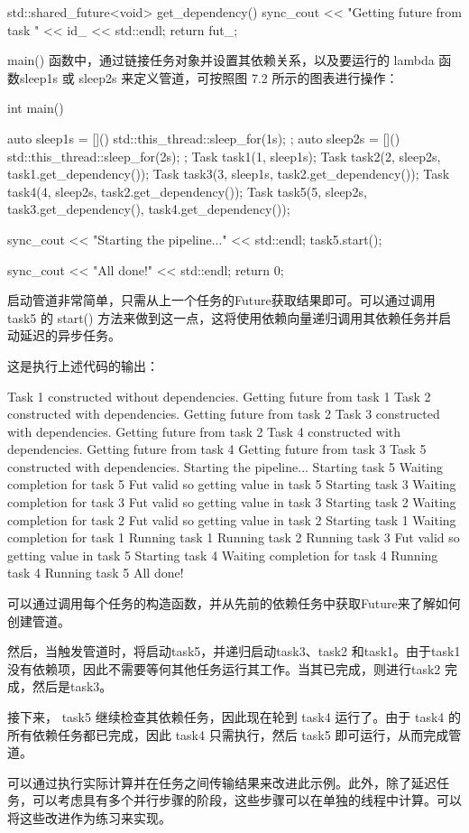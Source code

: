 \begin{cpp}
std::shared_future<void> get_dependency() {
    sync_cout << "Getting future from task "
              << id_ << std::endl;
    return fut_;
}
\end{cpp}

main() 函数中，通过链接任务对象并设置其依赖关系，以及要运行的 lambda 函数sleep1s 或 sleep2s 来定义管道，可按照图 7.2 所示的图表进行操作：

\begin{cpp}
int main() {
    auto sleep1s = [](){
        std::this_thread::sleep_for(1s);
    };
    auto sleep2s = [](){
        std::this_thread::sleep_for(2s);
    };
    Task task1(1, sleep1s);
    Task task2(2, sleep2s, task1.get_dependency());
    Task task3(3, sleep1s, task2.get_dependency());
    Task task4(4, sleep2s, task2.get_dependency());
    Task task5(5, sleep2s, task3.get_dependency(),
               task4.get_dependency());

    sync_cout << "Starting the pipeline..." << std::endl;
    task5.start();

    sync_cout << "All done!" << std::endl;
    return 0;
}
\end{cpp}

启动管道非常简单，只需从上一个任务的Future获取结果即可。可以通过调用 task5 的 start() 方法来做到这一点，这将使用依赖向量递归调用其依赖任务并启动延迟的异步任务。

这是执行上述代码的输出：

\begin{shell}
Task 1 constructed without dependencies.
Getting future from task 1
Task 2 constructed with dependencies.
Getting future from task 2
Task 3 constructed with dependencies.
Getting future from task 2
Task 4 constructed with dependencies.
Getting future from task 4
Getting future from task 3
Task 5 constructed with dependencies.
Starting the pipeline...
Starting task 5
Waiting completion for task 5
Fut valid so getting value in task 5
Starting task 3
Waiting completion for task 3
Fut valid so getting value in task 3
Starting task 2
Waiting completion for task 2
Fut valid so getting value in task 2
Starting task 1
Waiting completion for task 1
Running task 1
Running task 2
Running task 3
Fut valid so getting value in task 5
Starting task 4
Waiting completion for task 4
Running task 4
Running task 5
All done!
\end{shell}

可以通过调用每个任务的构造函数，并从先前的依赖任务中获取Future来了解如何创建管道。

然后，当触发管道时，将启动task5，并递归启动task3、task2 和task1。由于task1 没有依赖项，因此不需要等何其他任务运行其工作。当其已完成，则进行task2 完成，然后是task3。

接下来， task5 继续检查其依赖任务，因此现在轮到 task4 运行了。由于 task4 的所有依赖任务都已完成，因此 task4 只需执行，然后 task5 即可运行，从而完成管道。

可以通过执行实际计算并在任务之间传输结果来改进此示例。此外，除了延迟任务，可以考虑具有多个并行步骤的阶段，这些步骤可以在单独的线程中计算。可以将这些改进作为练习来实现。
